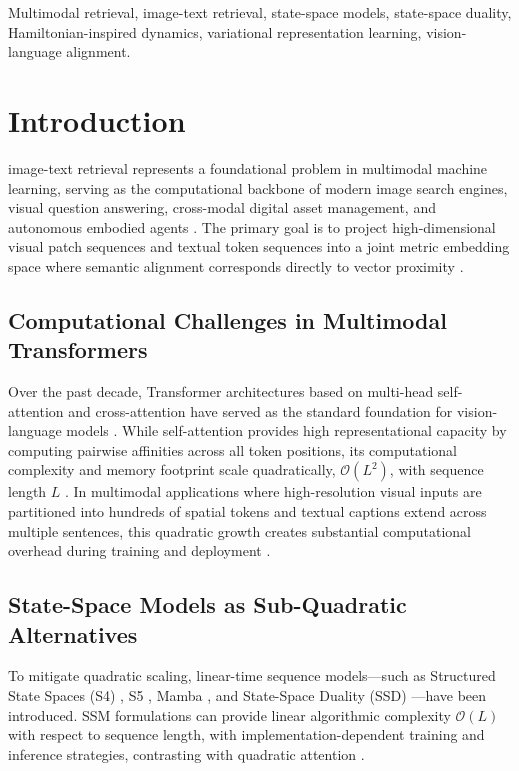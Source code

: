 \documentclass[journal]{IEEEtran}
\begin{document}
\begin{IEEEkeywords}
Multimodal retrieval, image-text retrieval, state-space models, state-space duality, Hamiltonian-inspired dynamics, variational representation learning, vision-language alignment.
\end{IEEEkeywords}

\section{Introduction}
\label{sec:introduction}
 image-text retrieval represents a foundational problem in multimodal machine learning, serving as the computational backbone of modern image search engines, visual question answering, cross-modal digital asset management, and autonomous embodied agents \cite{radford2021learning,li2022blip,jia2021scaling}. The primary goal is to project high-dimensional visual patch sequences and textual token sequences into a joint metric embedding space where semantic alignment corresponds directly to vector proximity \cite{faghri2017vse++,lee2018stacked}.

\subsection{Computational Challenges in Multimodal Transformers}
Over the past decade, Transformer architectures based on multi-head self-attention and cross-attention have served as the standard foundation for vision-language models \cite{vaswani2017attention,dosovitskiy2020image,liu2019roberta}. While self-attention provides high representational capacity by computing pairwise affinities across all token positions, its computational complexity and memory footprint scale quadratically, $\mathcal{O}(L^2)$, with sequence length $L$ \cite{dao2022flashattention}. In multimodal applications where high-resolution visual inputs are partitioned into hundreds of spatial tokens and textual captions extend across multiple sentences, this quadratic growth creates substantial computational overhead during training and deployment \cite{li2023blip2,wang2023image}.

\subsection{State-Space Models as Sub-Quadratic Alternatives}
To mitigate quadratic scaling, linear-time sequence models---such as Structured State Spaces (S4) \cite{gu2021efficiently}, S5 \cite{smith2022simplified}, Mamba \cite{gu2023mamba}, and State-Space Duality (SSD) \cite{dao2024transformers}---have been introduced. SSM formulations can provide linear algorithmic complexity $\mathcal{O}(L)$ with respect to sequence length, with implementation-dependent training and inference strategies, contrasting with quadratic attention \cite{gu2020hippo,smith2022simplified}.
\end{document}
